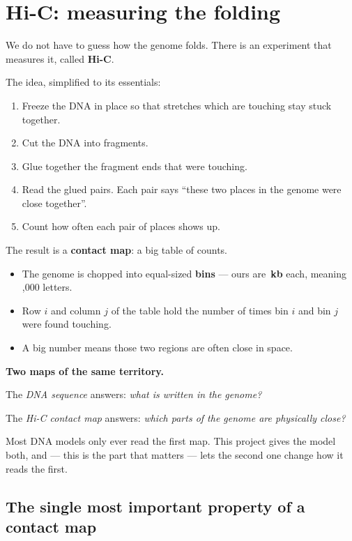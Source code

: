 \documentclass[11pt,a4paper]{article}
\newcommand{\term}[1]{\textcolor{deepblue}{\textbf{#1}}}
\begin{document}
\section{Hi-C: measuring the folding}

We do not have to guess how the genome folds. There is an experiment that
measures it, called \term{Hi-C}.

The idea, simplified to its essentials:

\begin{enumerate}
\item Freeze the DNA in place so that stretches which are touching stay stuck
      together.
\item Cut the DNA into fragments.
\item Glue together the fragment ends that were touching.
\item Read the glued pairs. Each pair says ``these two places in the genome were
      close together''.
\item Count how often each pair of places shows up.
\end{enumerate}

The result is a \term{contact map}: a big table of counts.

\begin{itemize}
\item The genome is chopped into equal-sized \term{bins} --- ours are
      \textbf{\WEbinkb\,kb} each, meaning \WEbinkb{},000 letters.
\item Row $i$ and column $j$ of the table hold the number of times bin $i$ and
      bin $j$ were found touching.
\item A big number means those two regions are often close in space.
\end{itemize}

\begin{plainbox}
\textbf{Two maps of the same territory.}

The \emph{DNA sequence} answers: \emph{what is written in the genome?}

The \emph{Hi-C contact map} answers: \emph{which parts of the genome are
physically close?}

Most DNA models only ever read the first map. This project gives the model both,
and --- this is the part that matters --- lets the second one change how it reads
the first.
\end{plainbox}

\subsection{The single most important property of a contact map}
\end{document}
